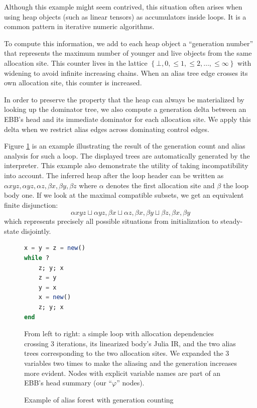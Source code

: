 \documentclass[11pt]{article}
\renewcommand{\phi}{\varphi}
\begin{document}
Although this example might seem contrived, this situation often arises when using heap objects (such as linear tensors) as accumulators inside loops.
It is a common pattern in iterative numeric algorithms.

To compute this information, we add to each heap object a ``generation number'' that represents the maximum number of younger and live objects from the same allocation site. This counter lives in the lattice $\left\{\bot, 0, \leq 1, \leq 2, \dots, \leq \infty \right\}$ with widening to avoid infinite increasing chains.
When an alias tree edge crosses its own allocation site, this counter is increased.

In order to preserve the property that the heap can always be materialized by looking up the dominator tree, we also compute a generation delta between an EBB's head and its immediate dominator for each allocation site.
We apply this delta when we restrict alias edges across dominating control edges.

Figure \ref{fig:gencount} is an example illustrating the result of the generation count and alias analysis for such a loop.
The displayed trees are automatically generated by the interpreter.
This example also demonstrate the utility of taking incompatibility into account.
The inferred heap after the loop header can be written as $\alpha xyz, \alpha yz, \alpha z, \beta x, \beta y, \beta z$ where $\alpha$ denotes the first allocation site and $\beta$ the loop body one.
If we look at the maximal compatible subsets, we get an equivalent finite disjunction: 
\[ \alpha xyz \sqcup \alpha yz, \beta x \sqcup \alpha z, \beta x, \beta y \sqcup \beta z, \beta x, \beta y \]
which represents precisely all possible situations from initialization to steady-state disjointly.

\begin{figure}

\begin{minipage}{0.2\linewidth}
\begin{lstlisting}[language=julia]
x = y = z = new()
while ?
    z; y; x
    z = y
    y = x
    x = new()
    z; y; x
end
\end{lstlisting}
\end{minipage}
\qquad
\begin{minipage}{0.4\linewidth}
\scalebox{.7}{}
\end{minipage}
\caption{Example of alias forest with generation counting}
From left to right: a simple loop with allocation dependencies crossing 3 iterations, its linearized body's Julia IR, and the two alias trees corresponding to the two allocation sites.
We expanded the 3 variables two times to make the aliasing and the generation increases more evident.
Nodes with explicit variable names are part of an EBB's head summary (our ``$\phi$'' nodes).
\label{fig:gencount}
\end{figure}
\end{document}
